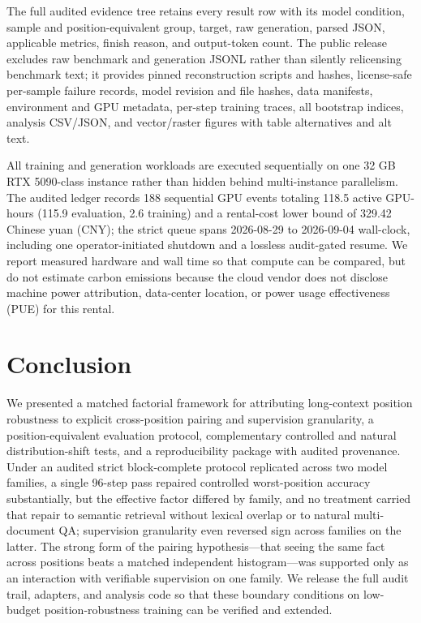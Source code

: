 \documentclass[11pt]{article}
\begin{document}
The full audited evidence tree retains every result row with its model condition, sample and position-equivalent group, target, raw generation, parsed JSON, applicable metrics, finish reason, and output-token count. The public release excludes raw benchmark and generation JSONL rather than silently relicensing benchmark text; it provides pinned reconstruction scripts and hashes, license-safe per-sample failure records, model revision and file hashes, data manifests, environment and GPU metadata, per-step training traces, all bootstrap indices, analysis CSV/JSON, and vector/raster figures with table alternatives and alt text.

All training and generation workloads are executed sequentially on one 32 GB RTX 5090-class instance rather than hidden behind multi-instance parallelism. The audited ledger records 188 sequential GPU events totaling 118.5 active GPU-hours (115.9 evaluation, 2.6 training) and a rental-cost lower bound of 329.42 Chinese yuan (CNY); the strict queue spans 2026-08-29 to 2026-09-04 wall-clock, including one operator-initiated shutdown and a lossless audit-gated resume. We report measured hardware and wall time so that compute can be compared, but do not estimate carbon emissions because the cloud vendor does not disclose machine power attribution, data-center location, or power usage effectiveness (PUE) for this rental.

\section{Conclusion}

We presented a matched factorial framework for attributing long-context position robustness to explicit cross-position pairing and supervision granularity, a position-equivalent evaluation protocol, complementary controlled and natural distribution-shift tests, and a reproducibility package with audited provenance. Under an audited strict block-complete protocol replicated across two model families, a single 96-step pass repaired controlled worst-position accuracy substantially, but the effective factor differed by family, and no treatment carried that repair to semantic retrieval without lexical overlap or to natural multi-document QA; supervision granularity even reversed sign across families on the latter. The strong form of the pairing hypothesis---that seeing the same fact across positions beats a matched independent histogram---was supported only as an interaction with verifiable supervision on one family. We release the full audit trail, adapters, and analysis code so that these boundary conditions on low-budget position-robustness training can be verified and extended.
\end{document}
